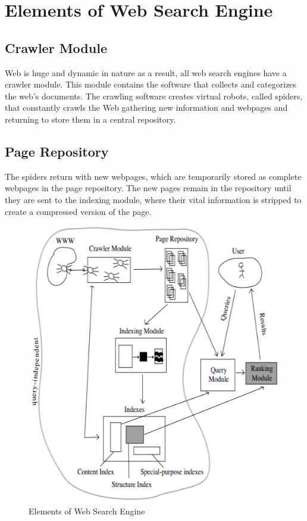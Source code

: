 \section{Elements of Web Search Engine}
	
\subsection{Crawler Module}
Web is huge and dynamic in nature as a result, all web search engines have a crawler module. This module contains the software that collects and categorizes the web's documents. The crawling software creates virtual robots, called spiders, that constantly crawls the Web gathering new information and webpages and returning to store them in a central repository.
	
\subsection{Page Repository}
The spiders return with new webpages, which are temporarily stored as complete webpages in the page repository. The new pages remain in the repository until they are sent to the indexing module, where their vital information is stripped to create a compressed version of the page.

\begin{figure}[h]
    \centering\includegraphics[scale=0.5]{engine.png}
    \caption{Elements of Web Search Engine}
    \label{fig:placeholder} %
    \end{figure}

